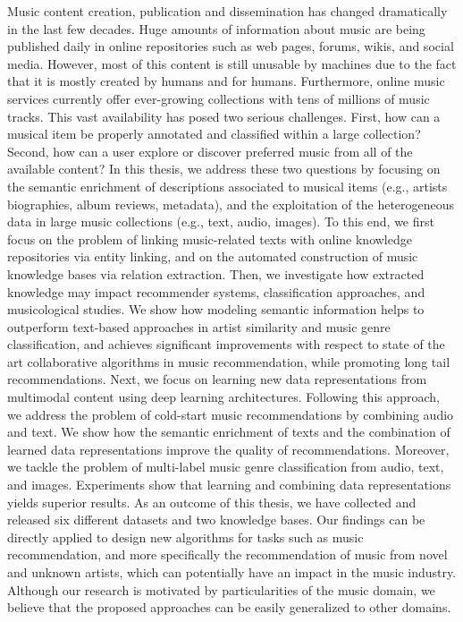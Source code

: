 Music content creation, publication and dissemination has changed dramatically in the last few decades. Huge amounts of information about music are being published daily in online repositories such as web pages, forums, wikis, and social media. However, most of this content is still unusable by machines due to the fact that it is mostly created by humans and for humans. Furthermore, online music services currently offer ever-growing collections with tens of millions of music tracks. This vast availability has posed two serious challenges. First, how can a musical item be properly annotated and classified within a large collection? Second, how can a user explore or discover preferred music from all of the available content? In this thesis, we address these two questions by focusing on the semantic enrichment of descriptions associated to musical items (e.g., artists biographies, album reviews, metadata), and the exploitation of the heterogeneous data in large music collections (e.g., text, audio, images). To this end, we first focus on the problem of linking music-related texts with online knowledge repositories via entity linking, and on the automated construction of music knowledge bases via relation extraction. Then, we investigate how extracted knowledge may impact recommender systems, classification approaches, and musicological studies. We show how modeling semantic information helps to outperform text-based approaches in artist similarity and music genre classification, and achieves significant improvements with respect to state of the art collaborative algorithms in music recommendation, while promoting long tail recommendations. Next, we focus on learning new data representations from multimodal content using deep learning architectures. Following this approach, we address the problem of cold-start music recommendations by combining audio and text. We show how the semantic enrichment of texts and the combination of learned data representations improve the quality of recommendations. Moreover, we tackle the problem of multi-label music genre classification from audio, text, and images. Experiments show that learning and combining data representations yields superior results. As an outcome of this thesis, we have collected and released six different datasets and two knowledge bases. Our findings can be directly applied to design new algorithms for tasks such as music recommendation, and more specifically the recommendation of music from novel and unknown artists, which can potentially have an impact in the music industry. Although our research is motivated by particularities of the music domain, we believe that the proposed approaches can be easily generalized to other domains.
